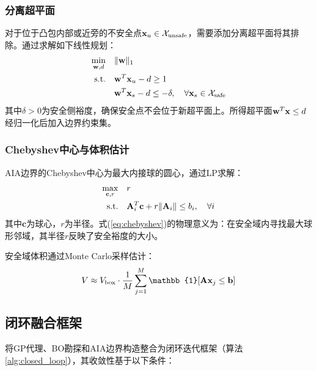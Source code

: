 \subsubsection{分离超平面}

对于位于凸包内部或近旁的不安全点$\mathbf{x}_u \in \mathcal{X}_{\text{unsafe}}$，需要添加分离超平面将其排除。通过求解如下线性规划：
\begin{equation}
    \begin{aligned}
        \min_{\mathbf{w}, d} \quad & \|\mathbf{w}\|_1 \\
        \text{s.t.} \quad & \mathbf{w}^T \mathbf{x}_u - d \geq 1 \\
        & \mathbf{w}^T \mathbf{x}_s - d \leq -\delta, \quad \forall \mathbf{x}_s \in \mathcal{X}_{\text{safe}}
    \end{aligned}
    \label{eq:separating_hp}
\end{equation}
其中$\delta > 0$为安全侧裕度，确保安全点不会位于新超平面上。所得超平面$\mathbf{w}^T \mathbf{x} \leq d$经归一化后加入边界约束集。

\subsubsection{Chebyshev中心与体积估计}

AIA边界的Chebyshev中心为最大内接球的圆心，通过LP求解：
\begin{equation}
    \begin{aligned}
        \max_{\mathbf{c}, r} \quad & r \\
        \text{s.t.} \quad & \mathbf{A}_i^T \mathbf{c} + r \|\mathbf{A}_i\| \leq b_i, \quad \forall i
    \end{aligned}
    \label{eq:chebyshev}
\end{equation}
其中$\mathbf{c}$为球心，$r$为半径。式(\ref{eq:chebyshev})的物理意义为：在安全域内寻找最大球形邻域，其半径$r$反映了安全裕度的大小。

安全域体积通过Monte Carlo采样估计：
\begin{equation}
    V \approx V_{\text{box}} \cdot \frac{1}{M} \sum_{j=1}^M \mathbb{1}[\bA \bx_j \leq \bb]
    \label{eq:volume}
\end{equation}

\subsection{闭环融合框架}
\label{subsec:closed_loop}



将GP代理、BO勘探和AIA边界构造整合为闭环迭代框架（算法\ref{alg:closed_loop}），其收敛性基于以下条件：

